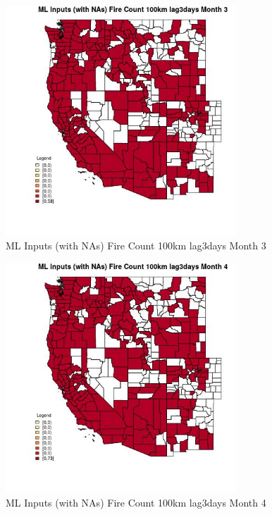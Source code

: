 \clearpage 

\begin{figure} 
\centering  
\includegraphics[width=0.77\textwidth]{Code_Outputs/Report_ML_input_PM25_Step4_part_e_de_duplicated_aves_compiled_2019-05-21wNAs_CountyFire_Count_100km_lag3daysmedianMonth3.jpg} 
\caption{\label{fig:Report_ML_input_PM25_Step4_part_e_de_duplicated_aves_compiled_2019-05-21wNAsCountyFire_Count_100km_lag3daysmedianMonth3}ML Inputs (with NAs) Fire Count 100km lag3days Month 3} 
\end{figure} 
 

\begin{figure} 
\centering  
\includegraphics[width=0.77\textwidth]{Code_Outputs/Report_ML_input_PM25_Step4_part_e_de_duplicated_aves_compiled_2019-05-21wNAs_CountyFire_Count_100km_lag3daysmedianMonth4.jpg} 
\caption{\label{fig:Report_ML_input_PM25_Step4_part_e_de_duplicated_aves_compiled_2019-05-21wNAsCountyFire_Count_100km_lag3daysmedianMonth4}ML Inputs (with NAs) Fire Count 100km lag3days Month 4} 
\end{figure} 
 

